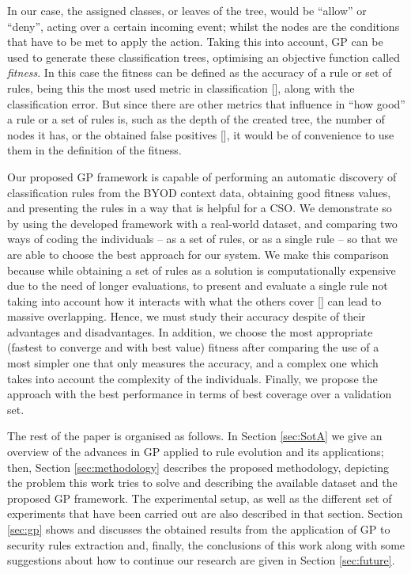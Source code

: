 In our case, the assigned classes, or leaves of the tree, would be ``allow''
or ``deny'', acting over a certain incoming event; whilst the nodes
are the conditions that have to be met to apply the action. Taking
this into account, GP can be used to generate these classification
trees, optimising an objective function called {\em fitness}. In this case the
fitness can be defined as the accuracy of a rule or set of rules, being this the most
used metric in classification [\cite{witten2005data}], along with the
classification error. But since there are other metrics that influence in
``how good'' a rule or a set of rules is, such as the depth of the
created tree, the number of nodes it has, or the obtained false positives
[\cite{back1996evolutionary}], it would be of convenience to use them in
the definition of the fitness. 

Our proposed GP framework is capable of performing an automatic discovery
of classification rules from the BYOD context data, obtaining good fitness values, and presenting the
rules in a way that is helpful for a CSO. We demonstrate so by using
the developed framework with a real-world dataset, and comparing two
ways of coding the individuals -- as a set of rules, or as a single
rule -- so that we are able to choose the best approach for our system. We make this comparison because while obtaining a set of rules as a solution is computationally expensive due to the need of longer evaluations, to present and evaluate a single rule not taking into account how it interacts with what the others cover [\cite{freitas2002data}] can lead to massive overlapping. Hence, we must study their accuracy despite of their advantages and disadvantages. In addition, we choose the most appropriate (fastest to converge and with best value) fitness after comparing the use of a most simpler one that only measures the accuracy, and a complex one which takes into account the complexity of the individuals. Finally, we propose the approach with the best performance in terms of best coverage over a validation set. 

The rest of the paper is organised as follows. In Section
\ref{sec:SotA} we give an overview of the advances in GP applied to
rule evolution and its applications; then, Section
\ref{sec:methodology} describes the proposed methodology, depicting
the problem this work tries to solve and describing the available
dataset and the proposed GP framework. The experimental setup, as %
well as the different set of experiments that have been carried out
are also described in that section. Section \ref{sec:gp} shows and discusses the
obtained results from the application of GP to security rules
extraction and, finally, the conclusions of this work along with some
suggestions about how to continue our research are given in Section
\ref{sec:future}.   

